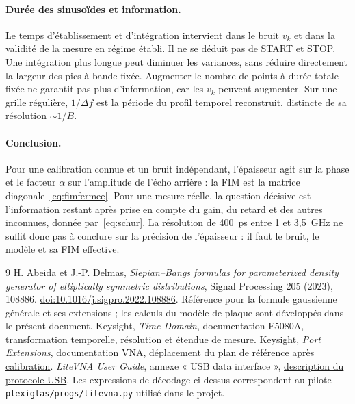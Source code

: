 \documentclass[11pt,a4paper]{article}
\begin{document}
\paragraph{Durée des sinusoïdes et information.}
Le temps d'établissement et d'intégration intervient dans le bruit $v_k$
et dans la validité de la mesure en régime établi. Il ne se déduit pas de
START et STOP. Une intégration plus longue peut diminuer les variances,
sans réduire directement la largeur des pics à bande fixée. Augmenter
le nombre de points à durée totale fixée ne garantit pas plus d'information,
car les $v_k$ peuvent augmenter. Sur une grille régulière, $1/\Delta f$
est la période du profil temporel reconstruit, distincte de sa résolution
$\sim1/B$.

\paragraph{Conclusion.}
Pour une calibration connue et un bruit indépendant, l'épaisseur agit
sur la phase et le facteur $\alpha$ sur l'amplitude de l'écho arrière :
la FIM est la matrice diagonale~\eqref{eq:fimfermee}. Pour une mesure réelle,
la question décisive est l'information restant après prise en compte du
gain, du retard et des autres inconnues, donnée par~\eqref{eq:schur}.
La résolution de 400~ps entre 1 et 3,5~GHz ne suffit donc pas à conclure
sur la précision de l'épaisseur : il faut le bruit, le modèle et sa FIM effective.

\begin{thebibliography}{9}
H. Abeida et J.-P. Delmas,
\emph{Slepian--Bangs formulas for parameterized density generator of
elliptically symmetric distributions}, Signal Processing 205 (2023), 108886.
\href{https://doi.org/10.1016/j.sigpro.2022.108886}{doi:10.1016/j.sigpro.2022.108886}.
Référence pour la formule gaussienne générale et ses extensions ; les
calculs du modèle de plaque sont développés dans le présent document.
Keysight, \emph{Time Domain}, documentation E5080A,
\href{https://helpfiles.keysight.com/csg/e5080a/time/timedomain.htm}
{transformation temporelle, résolution et étendue de mesure}.
Keysight, \emph{Port Extensions}, documentation VNA,
\href{https://helpfiles.keysight.com/csg/pxivna/S3_Cals/Port_Extensions.htm}
{déplacement du plan de référence après calibration}.
\emph{LiteVNA User Guide}, annexe « USB data interface »,
\href{https://nanovna.com/wp-content/uploads/2021/11/LiteVNA_User-Guide.pdf}
{description du protocole USB}. Les expressions de décodage ci-dessus
correspondent au pilote \texttt{plexiglas/progs/litevna.py} utilisé dans le projet.
\end{thebibliography}
\end{document}
